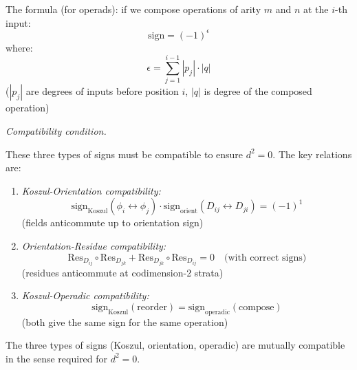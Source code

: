 \begin{convention}
The formula (for operads): if we compose operations of arity $m$ and $n$ at the $i$-th input:
\[\text{sign} = (-1)^{\epsilon}\]
where:
\[\epsilon = \sum_{j=1}^{i-1} |p_j| \cdot |q|\]
($|p_j|$ are degrees of inputs before position $i$, $|q|$ is degree of the composed operation)

\emph{Compatibility condition.}

These three types of signs must be compatible to ensure $d^2 = 0$. The key relations are:

\begin{enumerate}
\item \emph{Koszul-Orientation compatibility:}
\[\text{sign}_{\text{Koszul}}(\phi_i \leftrightarrow \phi_j) \cdot \text{sign}_{\text{orient}}(D_{ij} \leftrightarrow D_{ji}) = (-1)^{1}\]
(fields anticommute up to orientation sign)

\item \emph{Orientation-Residue compatibility:}
\[\text{Res}_{D_{ij}} \circ \text{Res}_{D_{jk}} + \text{Res}_{D_{jk}} \circ \text{Res}_{D_{ij}} = 0 \quad \text{(with correct signs)}\]
(residues anticommute at codimension-2 strata)

\item \emph{Koszul-Operadic compatibility:}
\[\text{sign}_{\text{Koszul}}(\text{reorder}) = \text{sign}_{\text{operadic}}(\text{compose})\]
(both give the same sign for the same operation)
\end{enumerate}

\end{convention}

\begin{lemma}\label{lem:sign-compatibility}
The three types of signs (Koszul, orientation, operadic) are mutually compatible in the sense required for $d^2 = 0$.
\end{lemma}

